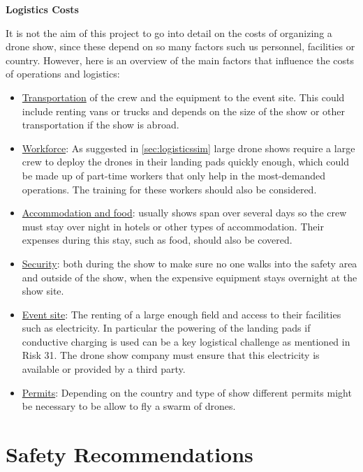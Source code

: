 \textbf{Logistics Costs}

It is not the aim of this project to go into detail on the costs of organizing a drone show, since these depend on so many factors such us personnel, facilities or country. However, here is an overview of the main factors that influence the costs of operations and logistics:
\begin{itemize}[noitemsep,nolistsep]
    \item \uline{Transportation} of the crew and the equipment to the event site. This could include renting vans or trucks and depends on the size of the show or other transportation if the show is abroad.
    
    \item \uline{Workforce}: As suggested in \autoref{sec:logisticssim} large drone shows require a large crew to deploy the drones in their landing pads quickly enough, which could be made up of part-time workers that only help in the most-demanded operations. The training for these workers should also be considered.
    
    \item \uline{Accommodation and food}: usually shows span over several days so the crew must stay over night in hotels or other types of accommodation. Their expenses during this stay, such as food, should also be covered.
    
    \item \uline{Security}: both during the show to make sure no one walks into the safety area and outside of the show, when the expensive equipment stays overnight at the show site.
    
    \item \uline{Event site}: The renting of a large enough field and access to their facilities such as electricity. In particular the powering of the landing pads if conductive charging is used can be a key logistical challenge as mentioned in Risk 31. The drone show company must ensure that this electricity is available or provided by a third party. 
    
    \item \uline{Permits}: Depending on the country and type of show different permits might be necessary to be allow to fly a swarm of drones.
\end{itemize}

\section{Safety Recommendations} \label{sec:safetyregulations}

